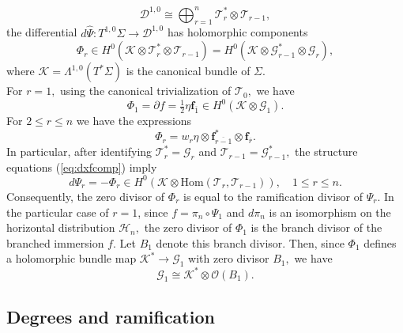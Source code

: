 \documentclass[11pt]{article}
\theoremstyle{definition}
\newcommand{\del}{\partial}
\numberwithin{equation}{section}
\begin{document}
\begin{equation*}
	\mathcal{D}^{1,0} \cong \bigoplus_{r=1}^{n} \mathcal{T}_r^* \otimes \mathcal{T}_{r-1},
\end{equation*}
the differential $d \widehat{\Psi} \colon T^{1,0}\Sigma \to \mathcal{D}^{1,0}$  has holomorphic components
\begin{equation*}
	\Phi_r \in H^0(\mathcal{K} \otimes \mathcal{T}_r^* \otimes \mathcal{T}_{r-1}) = H^0(\mathcal{K} \otimes \mathcal{G}_{r-1}^* \otimes \mathcal{G}_r),
\end{equation*}
where $\mathcal{K} = \Lambda^{1,0}(T^*\Sigma)$ is the canonical bundle of $\Sigma.$ \\
\indent For $r=1,$ using the canonical trivialization of $\mathcal{T}_0,$ we have
\begin{equation*}
	\Phi_1 = \del f = \tfrac{1}{2} \eta \mathbf{f}_{\overline{1}} \in H^0(\mathcal{K} \otimes \mathcal{G}_1).
\end{equation*}
For $2 \leq r \leq n$ we have the expressions
\begin{equation*}
	\Phi_r = w_r \eta \otimes \mathbf{f}_{\overline{r-1}}^* \otimes \mathbf{f}_{\overline{r}}.
\end{equation*}
In particular, after identifying $\mathcal{T}_r^* = \mathcal{G}_r$ and $\mathcal{T}_{r-1} = \mathcal{G}^{*}_{r-1},$ the structure equations (\ref{eq:dxfcomp}) imply
\begin{equation*}
	d \Psi_r = -\Phi_r \in H^{0}(\mathcal{K} \otimes \mathrm{Hom}(\mathcal{T}_r, \mathcal{T}_{r-1})), \quad 1 \leq r \leq n.
\end{equation*}
Consequently, the zero divisor of $\Phi_r$ is equal to the ramification divisor of $\Psi_r.$ In the particular case of $r = 1$, since $f = \pi_n \circ \Psi_1$ and $d \pi_n$ is an isomorphism on the horizontal distribution $\mathcal{H}_n,$ the zero divisor of $\Phi_1$ is the branch divisor of the branched immersion $f$. Let $B_1$ denote this branch divisor. Then, since $\Phi_1$ defines a holomorphic bundle map $\mathcal{K}^* \to \mathcal{G}_1$ with zero divisor $B_1,$ we have
\begin{equation*}
	\mathcal{G}_1 \cong \mathcal{K}^{*} \otimes \mathcal{O}(B_1).
\end{equation*}

\subsection{Degrees and ramification}\label{ssect:degram}
\end{document}
